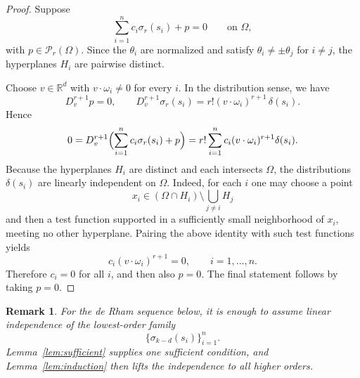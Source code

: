 \documentclass[pdflatex,sn-mathphys-num]{sn-jnl}
\newtheorem{remark}[theorem]{Remark}
\numberwithin{equation}{section}
\numberwithin{theorem}{section}
\numberwithin{table}{section}
\numberwithin{figure}{section}
\begin{document}
\begin{proof}
    Suppose
    \begin{equation}
    \sum_{i=1}^n c_i\sigma_r(s_i)+p=0
    \qquad\text{on }\Omega,
    \end{equation}
    with $p\in\mathcal P _r(\Omega)$. Since the $\theta_i$ are normalized and satisfy $\theta_i\neq\pm\theta_j$ for $i\neq j$, the hyperplanes $H_i$ are pairwise distinct.
    
     Choose $v\in\mathbb  R  ^d$ with $v\cdot\omega_i\neq0$ for every $i$. In the distribution sense, we have
    \begin{equation}
    D_v^{r+1}p=0,
    \qquad
    D_v^{r+1}\sigma_r(s_i)=r!(v\cdot\omega_i)^{r+1}\,\delta(s_i).
    \end{equation}
    Hence
    \begin{equation}
    0=D_v^{r+1}\Bigl(\sum_{i=1}^n c_i\sigma_r(s_i)+p\Bigr)
    =r!\sum_{i=1}^n c_i(v\cdot\omega_i)^{r+1}\delta(s_i).
    \end{equation}
    Because the hyperplanes $H_i$ are distinct and each intersects $\Omega$, the distributions $\delta(s_i)$ are linearly independent on $\Omega$. Indeed, for each $i$ one may choose a point
    \begin{equation}
    x_i\in (\Omega\cap H_i)\setminus \bigcup_{j\neq i}H_j
    \end{equation}
    and then a test function supported in a sufficiently small neighborhood of $x_i$, meeting no other hyperplane. Pairing the above identity with such test functions yields
    \begin{equation}
    c_i(v\cdot\omega_i)^{r+1}=0,
    \qquad i=1,\dots,n.
    \end{equation}
    Therefore $c_i=0$ for all $i$, and then also $p=0$.
    The final statement follows by taking $p=0$.
\end{proof}

\begin{remark}
    For the de Rham sequence below, it is enough to assume linear independence of the lowest-order family
    \begin{equation}
    \{\sigma_{k-d}(s_i)\}_{i=1}^n.
    \end{equation}
    Lemma~\ref{lem:sufficient} supplies one sufficient condition, and Lemma~\ref{lem:induction} then lifts the independence to all higher orders.
\end{remark}
\end{document}
